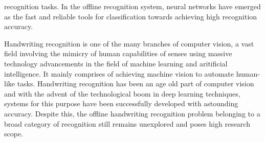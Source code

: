 \documentclass[main.tex]{subfiles}
\begin{document}
recognition tasks. In the offline recognition system, neural networks have
emerged as the fast and reliable tools for classification towards achieving high
recognition accuracy.
\par Handwriting recognition is one of the many branches of computer vision, a
vast field involving the mimicry of human capabilities of senses using massive
technology advancements in the field of machine learning and aritificial
intelligence. It mainly comprises of achieving machine vision to automate
human-like tasks. Handwriting recognition has been an age old part of computer
vision and with the advent of the technological boom in deep learning
techniques, systems for this purpose have been successfully developed with
astounding accuracy. Despite this, the offline handwriting recognition problem
belonging to a broad category of recognition still remains unexplored and poses
high research scope.
\end{document}
